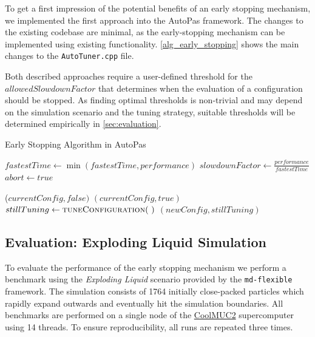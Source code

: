 \documentclass[conference]{IEEEtran}
\begin{document}
To get a first impression of the potential benefits of an early stopping mechanism, we implemented the first approach into the AutoPas framework. The changes to the existing codebase are minimal, as the early-stopping mechanism can be implemented using existing functionality. \autoref{alg_early_stopping} shows the main changes to the \texttt{AutoTuner.cpp} file.

Both described approaches require a user-defined threshold for the $allowedSlowdownFactor$ that determines when the evaluation of a configuration should be stopped. As finding optimal thresholds is non-trivial and may depend on the simulation scenario and the tuning strategy, suitable thresholds will be determined empirically in \autoref{sec:evaluation}.

\begin{algorithm}[h]
    \small
    \caption{Early Stopping Algorithm in AutoPas}
    \label{alg_early_stopping}
    \begin{algorithmic}[1]
        \State $fastestTime \gets \min(fastestTime, performance)$
        \State $slowdownFactor \gets \frac{performance}{fastestTime}$
        \State $abort \gets true$
        \EndIf
        \EndProcedure

        \vspace{0.5em}

        \State \Return ($currentConfig, false)$
            \State \Return $(currentConfig, true)$
            \Else
            \State $stillTuning \gets \Call{tuneConfiguration}{~}$
            \State \Return $(newConfig, stillTuning)$
        \EndIf
        \EndProcedure
    \end{algorithmic}
\end{algorithm}

\subsection{Evaluation: Exploding Liquid Simulation}
\label{sec:evaluation}

To evaluate the performance of the early stopping mechanism we perform a benchmark using the \textit{Exploding Liquid} scenario provided by the \texttt{md-flexible} framework. The simulation consists of 1764 initially close-packed particles which rapidly expand outwards and eventually hit the simulation boundaries. All benchmarks are performed on a single node of the \href{https://doku.lrz.de/coolmuc-2-11484376.html}{CoolMUC2} supercomputer using 14 threads. To ensure reproducibility, all runs are repeated three times.
\end{document}
